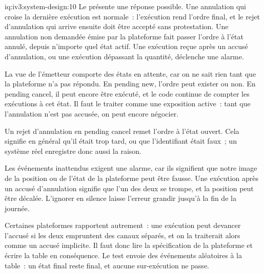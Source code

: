 \begin{solution}{iq:iv3:system-design:10}
Le  présente une réponse possible. Une annulation qui croise la dernière exécution est normale~: l'exécution rend l'ordre final, et le rejet d'annulation qui arrive ensuite doit être accepté sans protestation. Une annulation non demandée émise par la plateforme fait passer l'ordre à l'état annulé, depuis n'importe quel état actif. Une exécution reçue après un accusé d'annulation, ou une exécution dépassant la quantité, déclenche une alarme.
\enlargethispage{-3\baselineskip}%
\label{lst:iv3:sd:states}

La vue de l'émetteur comporte des états en attente, car on ne sait rien tant que la plateforme n'a pas répondu. En pending new, l'ordre peut exister ou non. En pending cancel, il peut encore être exécuté, et le code continue de compter les exécutions à cet état. Il faut le traiter comme une exposition active~: tant que l'annulation n'est pas accusée, on peut encore négocier.

Un rejet d'annulation en pending cancel remet l'ordre à l'état ouvert. Cela signifie en général qu'il était trop tard, ou que l'identifiant était faux~; un système réel enregistre donc aussi la raison.

Les événements inattendus exigent une alarme, car ils signifient que notre image de la position ou de l'état de la plateforme peut être fausse. Une exécution après un accusé d'annulation signifie que l'un des deux se trompe, et la position peut être décalée. L'ignorer en silence laisse l'erreur grandir jusqu'à la fin de la journée.

Certaines plateformes rapportent autrement~: une exécution peut devancer l'accusé si les deux empruntent des canaux séparés, et on la traiterait alors comme un accusé implicite. Il faut donc lire la spécification de la plateforme et écrire la table en conséquence. Le test envoie des événements aléatoires à la table~: un état final reste final, et aucune sur-exécution ne passe.

\end{solution}

